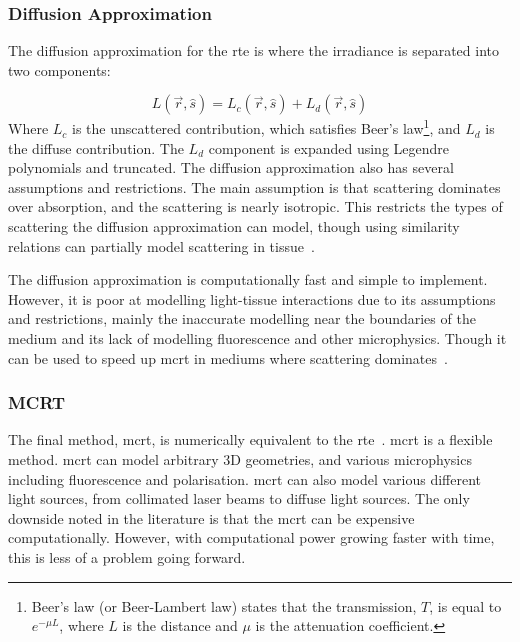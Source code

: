 \subsubsection*{Diffusion Approximation}
\label{sec:diffusionapprox}
The diffusion approximation for the \gls*{rte} is where the irradiance is separated into two components:

\begin{equation}
	L(\vec{r},\hat{s}) = L_c(\vec{r},\hat{s}) + L_d(\vec{r},\hat{s})
\end{equation}
Where $L_c$ is the unscattered contribution, which satisfies Beer's law\footnote{Beer's law (or Beer-Lambert law) states that the transmission, $T$, is equal to $e^{-\mu L}$, where $L$ is the distance and $\mu$ is the attenuation coefficient.}, and $L_d$ is the diffuse contribution. The $L_d$ component is expanded using Legendre polynomials and truncated. 
The diffusion approximation also has several assumptions and restrictions. The main assumption is that scattering dominates over absorption, and the scattering is nearly isotropic. This restricts the types of scattering the diffusion approximation can model, though using similarity relations can partially model scattering in tissue~\cite{graaff1993similarity,yoon1989accuracies}.

The diffusion approximation is computationally fast and simple to implement. However, it is poor at modelling light-tissue interactions due to its assumptions and restrictions, mainly the inaccurate modelling near the boundaries of the medium and its lack of modelling fluorescence and other microphysics. Though it can be used to speed up \gls*{mcrt} in mediums where scattering dominates~\cite{robitaille2010modified,min2009radiative}.

\subsubsection*{MCRT}
The final method, \gls*{mcrt}, is numerically equivalent to the \gls*{rte}~\cite{wang2012biomedical}. \gls*{mcrt} is a flexible method. 
\Gls*{mcrt} can model arbitrary 3D geometries, and various microphysics including fluorescence and polarisation.
\Gls*{mcrt} can also model various different light sources, from collimated laser beams to diffuse light sources. The only downside noted in the literature is that the \gls*{mcrt} can be expensive computationally. However, with computational power growing faster with time, this is less of a problem going forward. 

